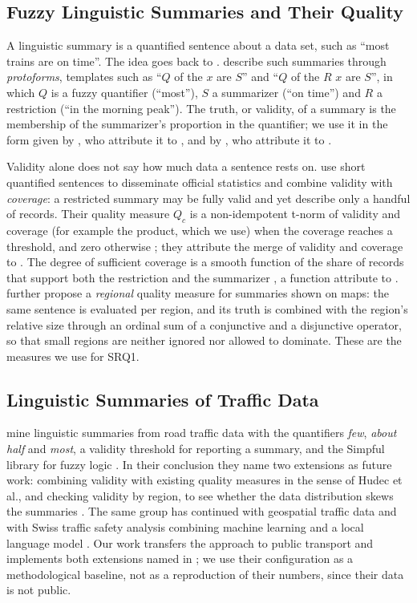 \subsection{Fuzzy Linguistic Summaries and Their Quality}
\label{sec:rw-ls}
A linguistic summary is a quantified sentence about a data set, such as ``most trains are on
time''. The idea goes back to \citet{yager1982}. \citet{kacprzyk2009} describe such
summaries through \emph{protoforms}, templates such as ``$Q$ of the $x$ are $S$'' and ``$Q$ of
the $R$ $x$ are $S$'', in which $Q$ is a fuzzy quantifier (``most''), $S$ a summarizer
(``on time'') and $R$ a restriction (``in the morning peak''). The truth, or validity, of a
summary is the membership of the summarizer's proportion in the quantifier; we use it in
the form given by \citet[Eq.~(2)]{pincay2021}, who attribute it to \citet{kacprzyk2009}, and
by \citet[Eqs.~(5)--(6)]{hudec2022}, who attribute it to \citet{yager1982}.

Validity alone does not say how much data a sentence rests on. \citet{hudec2018} use short
quantified sentences to disseminate official statistics and combine validity with
\emph{coverage}: a restricted summary may be fully valid and yet describe only a handful of
records. Their quality measure $Q_c$ is a non-idempotent t-norm of validity and coverage
(for example the product, which we use) when the coverage reaches a threshold, and zero
otherwise \citep[Eq.~(9)]{hudec2018}; they attribute
the merge of validity and coverage to \citet{hudec2017}. The degree of sufficient coverage is
a smooth function of the share of records that support both the restriction and the
summarizer \citep[Eqs.~(A.3)--(A.4)]{hudec2018}, a function \citet{hudec2022} attribute to
\citet{wu2010}. \citet{hudec2022} further propose a \emph{regional} quality measure for
summaries shown on maps: the same sentence is evaluated per region, and its truth is combined
with the region's relative size through an ordinal sum of a conjunctive and a disjunctive
operator, so that small regions are neither ignored nor allowed to dominate. These are the
measures we use for SRQ1.

\subsection{Linguistic Summaries of Traffic Data}
\label{sec:rw-traffic}
\citet{pincay2021} mine linguistic summaries from road traffic data with the quantifiers
\emph{few}, \emph{about half} and \emph{most}, a validity threshold for reporting a summary,
and the Simpful library for fuzzy logic \citep{spolaor2020}. In their conclusion they name
two extensions as future work: combining validity with existing quality measures in the
sense of Hudec et al., and checking validity by region, to see whether the data distribution
skews the summaries \citep[§5]{pincay2021}. The same group has continued with geospatial
traffic data \citep{pincay2022} and with Swiss traffic safety analysis combining machine
learning and a local language model \citep{pincay2026}. Our work transfers the approach to
public transport and implements both extensions named in \citet{pincay2021}; we use their
configuration as a methodological baseline, not as a reproduction of their numbers, since
their data is not public.

